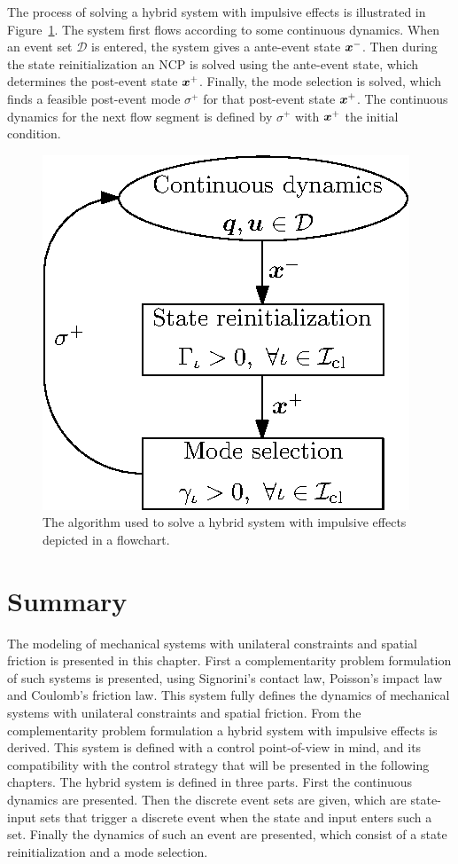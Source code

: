 \documentclass[../DC2017114Bouma.tex]{subfiles}
\begin{document}
The process of solving a hybrid system with impulsive effects is illustrated in Figure~\ref{fig:2hybridalg}. The system first flows according to some continuous dynamics. When an event set $\mathcal{D}$ is entered, the system gives a ante-event state ${\boldsymbol{x}}^-$. Then during the state reinitialization an NCP is solved using the ante-event state, which determines the post-event state ${\boldsymbol{x}}^+$. Finally, the mode selection is solved, which finds a feasible post-event mode $\sigma^+$ for that post-event state ${\boldsymbol{x}}^+$. The continuous dynamics for the next flow segment is defined by $\sigma^+$ with ${\boldsymbol{x}}^+$ the initial condition.

\begin{figure}[h]
\centering
\includegraphics[width=.35\textwidth]{hybridalg.eps}\caption{The algorithm used to solve a hybrid system with impulsive effects depicted in a flowchart.} \label{fig:2hybridalg}
\end{figure}

\section{Summary}
The modeling of mechanical systems with unilateral constraints and spatial friction is presented in this chapter. First a complementarity problem formulation of such systems is presented, using Signorini's contact law, Poisson's impact law and Coulomb's friction law. This system fully defines the dynamics of mechanical systems with unilateral constraints and spatial friction. From the complementarity problem formulation a hybrid system with impulsive effects is derived. This system is defined with a control point-of-view in mind, and its compatibility with the control strategy that will be presented in the following chapters. The hybrid system is defined in three parts. First the continuous dynamics are presented. Then the discrete event sets are given, which are state-input sets that trigger a discrete event when the state and input enters such a set. Finally the dynamics of such an event are presented, which consist of a state reinitialization and a mode selection.
\end{document}
